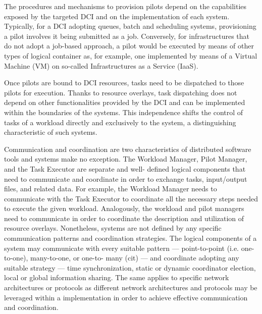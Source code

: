 \documentclass{sig-alternate}
\begin{document}
The procedures and mechanisms to provision pilots depend on the
capabilities exposed by the targeted DCI and on the implementation of
each \pilotjob system. Typically, for a DCI adopting queues, batch and
scheduling systems, provisioning a pilot involves it being submitted as
a job. Conversely, for infrastructures that do not adopt a job-based
approach, a pilot would be executed by means of other types of logical
container as, for example, one implemented by means of a Virtual
Machine (VM) on so-called Infrastructures as a Service (IaaS).


Once pilots are bound to DCI resources, tasks need to be dispatched to
those pilots for execution. Thanks to resource overlays, task
dispatching does not depend on other functionalities provided by the DCI
and can be implemented within the boundaries of the \pilotjob systems.
This independence shifts the control of tasks of a workload directly and
exclusively to the \pilotjob system, a distinguishing characteristic of
such systems.

Communication and coordination are two characteristics of distributed
software tools and \pilotjob systems make no exception. The Workload
Manager, Pilot Manager, and the Task Executor are separate and well-
defined logical components that need to communicate and coordinate in
order to exchange tasks, input/output files, and related data.  For
example, the Workload Manager needs to communicate with the Task
Executor to coordinate all the necessary steps needed to execute the
given workload. Analogously, the workload and pilot managers need to
communicate in order to coordinate the description and utilization of
resource overlays. Nonetheless, \pilotjob systems are not defined by any
specific communication patterns and coordination strategies. The logical
components of a \pilotjob system may communicate with every suitable
pattern --- point-to-point (i.e. one-to-one), many-to-one, or one-to-
many (cit) --- and coordinate adopting any suitable strategy --- time
synchronization, static or dynamic coordinator election, local or global
information sharing. The same applies to specific network architectures
or protocols as different network architectures and protocols may be
leveraged within a \pilotjob implementation in order to achieve
effective communication and coordination.
\end{document}
